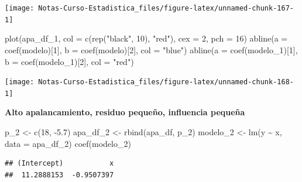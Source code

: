 \documentclass[
  12pt,
]{book}
\newenvironment{Shaded}{\begin{snugshade}}{\end{snugshade}}
\newcommand{\AttributeTok}[1]{\textcolor[rgb]{0.77,0.63,0.00}{#1}}
\newcommand{\DecValTok}[1]{\textcolor[rgb]{0.00,0.00,0.81}{#1}}
\newcommand{\FloatTok}[1]{\textcolor[rgb]{0.00,0.00,0.81}{#1}}
\newcommand{\FunctionTok}[1]{\textcolor[rgb]{0.00,0.00,0.00}{#1}}
\newcommand{\NormalTok}[1]{#1}
\newcommand{\OtherTok}[1]{\textcolor[rgb]{0.56,0.35,0.01}{#1}}
\newcommand{\SpecialCharTok}[1]{\textcolor[rgb]{0.00,0.00,0.00}{#1}}
\newcommand{\StringTok}[1]{\textcolor[rgb]{0.31,0.60,0.02}{#1}}
\theoremstyle{definition}
\theoremstyle{definition}
\theoremstyle{definition}
\theoremstyle{definition}
\theoremstyle{remark}
\begin{document}
\begin{center}\texttt{[image: Notas-Curso-Estadistica\_files/figure-latex/unnamed-chunk-167-1]} \end{center}

\begin{Shaded}
\begin{Highlighting}[]
\FunctionTok{plot}\NormalTok{(apa\_df\_1, }\AttributeTok{col =} \FunctionTok{c}\NormalTok{(}\FunctionTok{rep}\NormalTok{(}\StringTok{"black"}\NormalTok{, }\DecValTok{10}\NormalTok{), }\StringTok{"red"}\NormalTok{), }\AttributeTok{cex =} \DecValTok{2}\NormalTok{,}
    \AttributeTok{pch =} \DecValTok{16}\NormalTok{)}
\FunctionTok{abline}\NormalTok{(}\AttributeTok{a =} \FunctionTok{coef}\NormalTok{(modelo)[}\DecValTok{1}\NormalTok{], }\AttributeTok{b =} \FunctionTok{coef}\NormalTok{(modelo)[}\DecValTok{2}\NormalTok{], }\AttributeTok{col =} \StringTok{"blue"}\NormalTok{)}
\FunctionTok{abline}\NormalTok{(}\AttributeTok{a =} \FunctionTok{coef}\NormalTok{(modelo\_1)[}\DecValTok{1}\NormalTok{], }\AttributeTok{b =} \FunctionTok{coef}\NormalTok{(modelo\_1)[}\DecValTok{2}\NormalTok{],}
    \AttributeTok{col =} \StringTok{"red"}\NormalTok{)}
\end{Highlighting}
\end{Shaded}

\begin{center}\texttt{[image: Notas-Curso-Estadistica\_files/figure-latex/unnamed-chunk-168-1]} \end{center}

\textbf{Alto apalancamiento, residuo pequeño, influencia pequeña}

\begin{Shaded}
\begin{Highlighting}[]
\NormalTok{p\_2 }\OtherTok{\textless{}{-}} \FunctionTok{c}\NormalTok{(}\DecValTok{18}\NormalTok{, }\SpecialCharTok{{-}}\FloatTok{5.7}\NormalTok{)}
\NormalTok{apa\_df\_2 }\OtherTok{\textless{}{-}} \FunctionTok{rbind}\NormalTok{(apa\_df, p\_2)}
\NormalTok{modelo\_2 }\OtherTok{\textless{}{-}} \FunctionTok{lm}\NormalTok{(y }\SpecialCharTok{\textasciitilde{}}\NormalTok{ x, }\AttributeTok{data =}\NormalTok{ apa\_df\_2)}
\FunctionTok{coef}\NormalTok{(modelo\_2)}
\end{Highlighting}
\end{Shaded}

\begin{verbatim}
## (Intercept)           x 
##  11.2888153  -0.9507397
\end{verbatim}
\end{document}

